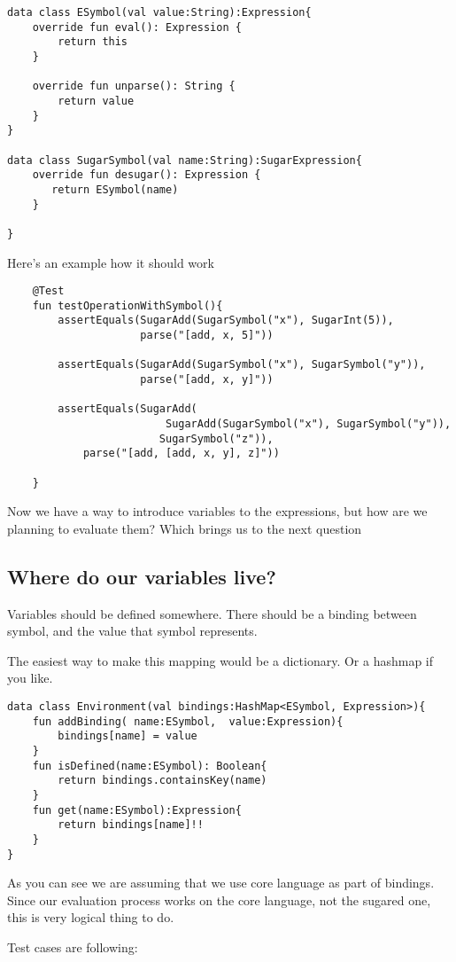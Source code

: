 \documentclass[11pt]{article}
\begin{document}
\begin{verbatim}
data class ESymbol(val value:String):Expression{
    override fun eval(): Expression {
        return this
    }

    override fun unparse(): String {
        return value
    }
}

data class SugarSymbol(val name:String):SugarExpression{
    override fun desugar(): Expression {
       return ESymbol(name)
    }

}
\end{verbatim}
Here's an example how it should work
\begin{verbatim}
    @Test
    fun testOperationWithSymbol(){
        assertEquals(SugarAdd(SugarSymbol("x"), SugarInt(5)),
                     parse("[add, x, 5]"))

        assertEquals(SugarAdd(SugarSymbol("x"), SugarSymbol("y")),
                     parse("[add, x, y]"))

        assertEquals(SugarAdd(
                         SugarAdd(SugarSymbol("x"), SugarSymbol("y")),
                        SugarSymbol("z")),
            parse("[add, [add, x, y], z]"))

    }
\end{verbatim}
Now we have a way to introduce variables to the expressions, but how are we planning to evaluate them?
Which brings us to the next question
\subsection{Where do our variables live?}
\label{sec:org00ec322}
Variables should be defined somewhere. There should be a binding between symbol, and the value that symbol represents.

The easiest way to make this mapping would be a dictionary. Or a hashmap if you like.

\begin{verbatim}
data class Environment(val bindings:HashMap<ESymbol, Expression>){
    fun addBinding( name:ESymbol,  value:Expression){
        bindings[name] = value
    }
    fun isDefined(name:ESymbol): Boolean{
        return bindings.containsKey(name)
    }
    fun get(name:ESymbol):Expression{
        return bindings[name]!!
    }
}
\end{verbatim}
As you can see we are assuming that we use core language as part of bindings.
Since our evaluation process works on the core language, not the sugared one, this is very logical thing to do.

Test cases are following:
\end{document}
